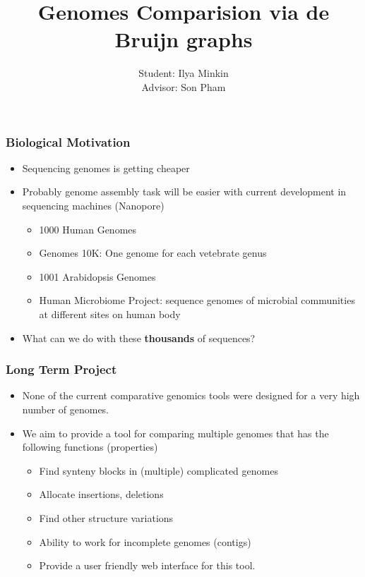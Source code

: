 \documentclass[svgnames,14pt]{beamer}
\title{Genomes Comparision via de Bruijn graphs}
\author{Student: Ilya Minkin \\ Advisor: Son Pham}
\institute{St. Petersburg Academic University}
\begin{document}
\maketitle

\begin{frame}
\frametitle{Biological Motivation}
\begin{itemize}
\item  Sequencing genomes is getting cheaper 
\item Probably genome assembly task will be easier with current development in sequencing machines (Nanopore) 
    \begin{itemize}
    \item  1000 Human Genomes
    \item Genomes 10K: One genome for each vetebrate genus
    \item 1001  Arabidopsis Genomes
    \item Human Microbiome Project: sequence genomes of microbial communities at different sites on human body
    \end{itemize}
\item  What can we do with these \textbf{thousands} of sequences?
\end{itemize}

\end{frame}

\begin{frame}
\frametitle{Long Term Project}

\begin{itemize}
\item None of the current comparative genomics tools were designed for a very high number of genomes.
\item We aim to  provide a tool for comparing multiple genomes that has the following functions (properties)
\begin{itemize}
\item Find synteny blocks in (multiple) complicated genomes
\item Allocate insertions, deletions
\item Find other structure variations
\item Ability to work for incomplete genomes (contigs)
\item Provide a user friendly web interface for this tool.
\end{itemize}
\end{itemize}
\end{frame}
\end{document}
